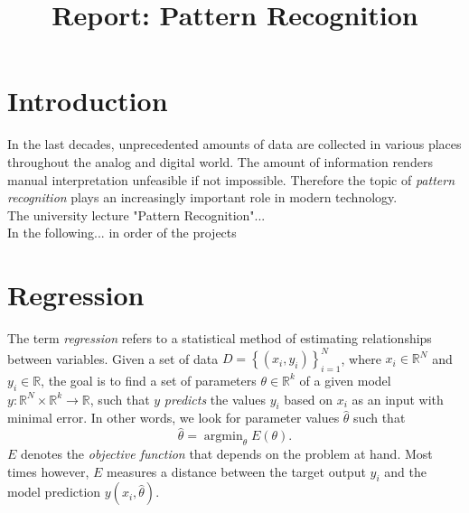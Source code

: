 \documentclass{article}
\title{Report: Pattern Recognition}
\DeclareMathOperator*{\argmin}{argmin} %
\begin{document}
%
\maketitle

\section{Introduction}
\label{sec:intro}

In the last decades, unprecedented amounts of data are collected in various places throughout the analog and digital world. The amount of information renders manual interpretation unfeasible if not impossible. Therefore the topic of \emph{pattern recognition} plays an increasingly important role in modern technology. \\
The university lecture "Pattern Recognition"... \\
In the following... in order of the projects

\section{Regression}
The term \emph{regression} refers to a statistical method of estimating relationships between variables. Given a set of data $D = \left\{ (x_i,y_i) \right\} _{i=1}^N$, where $x_i \in \mathbb{R}^N$ and $y_i \in \mathbb{R}$, the goal is to find a set of parameters $\theta \in \mathbb{R}^k$ of a given model $y:\mathbb{R}^N \times \mathbb{R}^k \to \mathbb{R}$, such that $y$ \emph{predicts} the values $y_i$ based on $x_i$ as an input with minimal error. In other words, we look for parameter values $\hat{\theta}$ such that
\begin{equation} \label{eq:argmin}
\hat{\theta} = \argmin_\theta E(\theta).
\end{equation}
$E$ denotes the \emph{objective function} that depends on the problem at hand. Most times however, $E$ measures a distance between the target output $y_i$ and the model prediction $y(x_i,\hat{\theta})$.
\end{document}

